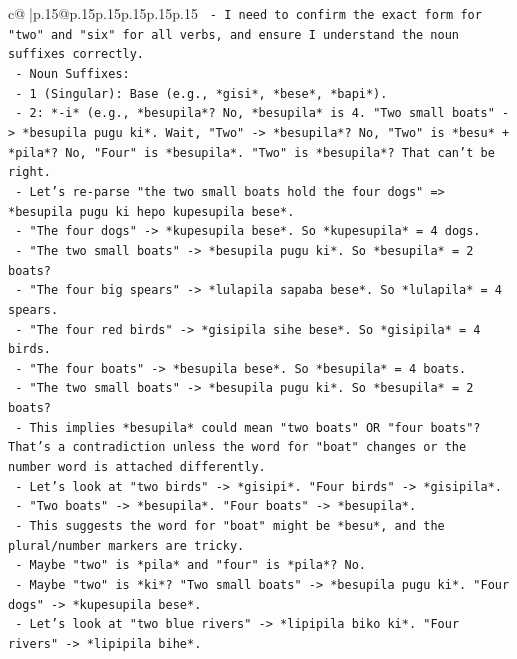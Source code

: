\documentclass{article}
\begin{document}
{\begin{supertabular}{c@{$\;$}|p{.15\linewidth}@{}p{.15\linewidth}p{.15\linewidth}p{.15\linewidth}p{.15\linewidth}p{.15\linewidth}}
{{{\texttt{      {-} I need to confirm the exact form for "two" and "six" for all verbs, and ensure I understand the noun suffixes correctly.} \\
\texttt{      {-} Noun Suffixes:} \\
\texttt{        {-} 1 (Singular): Base (e.g., *gisi*, *bese*, *bapi*).} \\
\texttt{        {-} 2: *{-}i* (e.g., *besupila*? No, *besupila* is 4. "Two small boats" {-}> *besupila pugu ki*. Wait, "Two" {-}> *besupila*? No, "Two" is *besu* + *pila*? No, "Four" is *besupila*. "Two" is *besupila*? That can't be right.} \\
\texttt{        {-} Let's re{-}parse "the two small boats hold the four dogs" => *besupila pugu ki hepo kupesupila bese*.} \\
\texttt{          {-} "The four dogs" {-}> *kupesupila bese*. So *kupesupila* = 4 dogs.} \\
\texttt{          {-} "The two small boats" {-}> *besupila pugu ki*. So *besupila* = 2 boats?} \\
\texttt{          {-} "The four big spears" {-}> *lulapila sapaba bese*. So *lulapila* = 4 spears.} \\
\texttt{          {-} "The four red birds" {-}> *gisipila sihe bese*. So *gisipila* = 4 birds.} \\
\texttt{          {-} "The four boats" {-}> *besupila bese*. So *besupila* = 4 boats.} \\
\texttt{          {-} "The two small boats" {-}> *besupila pugu ki*. So *besupila* = 2 boats?} \\
\texttt{          {-} This implies *besupila* could mean "two boats" OR "four boats"? That's a contradiction unless the word for "boat" changes or the number word is attached differently.} \\
\texttt{          {-} Let's look at "two birds" {-}> *gisipi*. "Four birds" {-}> *gisipila*.} \\
\texttt{          {-} "Two boats" {-}> *besupila*. "Four boats" {-}> *besupila*.} \\
\texttt{          {-} This suggests the word for "boat" might be *besu*, and the plural/number markers are tricky.} \\
\texttt{          {-} Maybe "two" is *pila* and "four" is *pila*? No.} \\
\texttt{          {-} Maybe "two" is *ki*? "Two small boats" {-}> *besupila pugu ki*. "Four dogs" {-}> *kupesupila bese*.} \\
\texttt{          {-} Let's look at "two blue rivers" {-}> *lipipila biko ki*. "Four rivers" {-}> *lipipila bihe*.} \\
}}}
\end{supertabular}}
\end{document}

